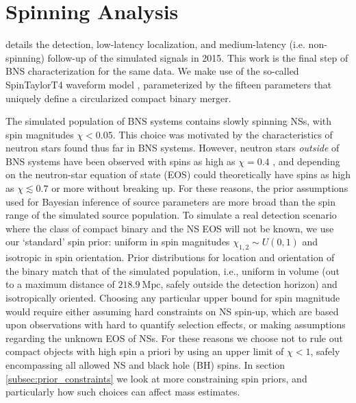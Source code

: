 \section{Spinning Analysis}
\label{sec:spin}

\citet{Singer_2014} details the detection, low-latency localization, and medium-latency (i.e. non-spinning) follow-up of the simulated signals in 2015. This work is the final step of BNS characterization for the same data. We make use of the so-called SpinTaylorT4 waveform model \citep{Buonanno_2003,Buonanno_2009}, parameterized by the fifteen parameters that uniquely define a circularized compact binary merger.

The simulated population of BNS systems contains slowly spinning NSs, with spin magnitudes $\chi < 0.05$.  This choice was motivated by the characteristics of neutron stars found thus far in BNS systems. However, neutron stars \emph{outside} of BNS systems have been observed with spins as high as $\chi = 0.4$ \citep{Hessels_2006,Brown_2012}, and depending on the neutron-star equation of state (EOS) could theoretically have spins as high as $\chi \lesssim 0.7$ \citep{Lo_2011} or more without breaking up.  For these reasons, the prior assumptions used for Bayesian inference of source parameters are more broad than the spin range of the simulated source population.  To simulate a real detection scenario where the class of compact binary and the NS EOS will not be known, we use our `standard' spin prior: uniform in spin magnitudes $\chi_{1,2} \sim U(0, 1)$ and isotropic in spin orientation. Prior distributions for location and orientation of the binary match that of the simulated population, i.e., uniform in volume (out to a maximum distance of $218.9~\mathrm{Mpc}$, safely outside the detection horizon) and isotropically oriented.  Choosing any particular upper bound for spin magnitude would require either assuming hard constraints on NS spin-up, which are based upon observations with hard to quantify selection effects, or making assumptions regarding the unknown EOS of NSs. For these reasons we choose not to rule out compact objects with high spin a priori by using an upper limit of $\chi < 1$, safely encompassing all allowed NS and black hole (BH) spins.  In section \ref{subsec:prior_constraints} we look at more constraining spin priors, and particularly how such choices can affect mass estimates.
  